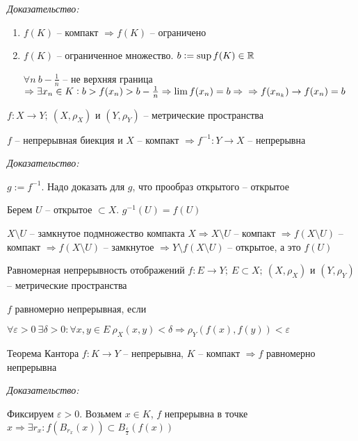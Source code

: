 \documentclass[12pt]{article}
\begin{document}
\textit{Доказательство:}

\begin{enumerate}
    \item $f(K)$ -- компакт $\Rightarrow f(K)$ -- ограничено
    \item $f(K)$ -- ограниченное множество. $b := \sup f(K) \in \mathbb R$
    
    $\forall n\ b - \frac{1}{n}$ -- не верхняя граница $\Rightarrow \exists x_n \in K : b > f(x_n) > b - \frac{1}{n} \Rightarrow \lim f(x_n) = b \Rightarrow \\ \Rightarrow f(x_{n_k}) \to f(x_n) = b$
\end{enumerate}

\begin{theo}{}
    $f : X \to Y;\ (X, \rho_X)$ и $(Y, \rho_Y)$ -- метрические пространства

    $f$ -- непрерывная биекция и $X$ -- компакт $\Rightarrow f^{-1} : Y \to X$ -- непрерывна
\end{theo}

\textit{Доказательство:}

$g := f^{-1}$. Надо доказать для $g$, что прообраз открытого -- открытое

Берем $U$ -- открытое $\subset X$. $g^{-1}(U) = f(U)$ 

$X \setminus U$ -- замкнутое подмножество компакта $X \Rightarrow X \setminus U$ -- компакт $\Rightarrow f(X \setminus U)$ -- компакт $\Rightarrow f(X \setminus U)$ -- замкнутое $\Rightarrow Y \setminus f(X \setminus U)$ -- открытое, а это $f(U)$

\begin{defin}{Равномерная непрерывность отображений}
    $f : E \to Y;\ E \subset X;\ (X, \rho_X)$ и $(Y, \rho_Y)$ -- метрические пространства

    $f$ равномерно непрерывная, если 
    
    $\forall \varepsilon > 0\ \exists \delta > 0 : \forall x, y \in E\ \rho_X(x, y) < \delta \Rightarrow \rho_Y(f(x), f(y)) < \varepsilon$
\end{defin}

\begin{theo}{Теорема Кантора}
    $f : K \to Y$ -- непрерывна, $K$ -- компакт $\Rightarrow f$ равномерно непрерывна
\end{theo}

\newpage

\textit{Доказательство:}

Фиксируем $\varepsilon > 0$. Возьмем $x \in K$, $f$ непрерывна в точке $x \Rightarrow \exists r_x : f(B_{r_x}(x)) \subset B_{\frac{\varepsilon}{2}}(f(x))$
\end{document}
